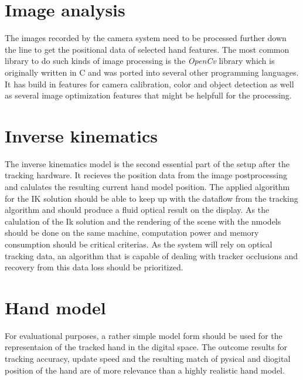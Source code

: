\section{Image analysis}
The images recorded by the camera system need to be processed further down the line to get the positional data of selected hand features. The most common library to do such kinds of image processing is the \textit{OpenCv} library which is originally written in C and was ported into several other programming languages. It has build in features for camera calibration, color and object detection as well as several image optimization features that might be helpfull for the processing.
\section{Inverse kinematics}
The inverse kinematics model is the second essential part of the setup after the tracking hardware. It recieves the position data from the image postprocessing and calulates the resulting current hand model position. The applied algorithm for the IK solution should be able to keep up with the dataflow from the tracking algorithm and should produce a fluid optical result on the display. As the calulation of the Ik solution and the rendering of the scene with the nmodels should be done on the same machine, computation power and memory consumption should be critical criterias. As the system will rely on optical tracking data, an algorithm that is capable of dealing with tracker occlusions and recovery from this data loss  should be prioritized. 
\cite{Lansley.2016}
\section{Hand model}
For evaluational purposes, a rather simple model form should be used for the representaion of the tracked hand in the digital space. The outcome results for tracking accuracy, update speed and the resulting match of pysical and diogital position of the hand are of more relevance than a highly realistic hand model.
 